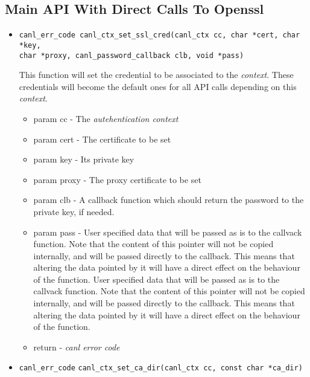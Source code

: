 \subsection{Main API With Direct Calls To Openssl}

\begin{itemize}
  \item \begin{verbatim}canl_err_code canl_ctx_set_ssl_cred(canl_ctx cc, char *cert, char *key,
char *proxy, canl_password_callback clb, void *pass)\end{verbatim}
  This function will set the credential to be associated to the
  \textit{context}.  These credentials will become the default ones 
  for all API calls depending on this \textit{context}.
  \begin{itemize}
    \item param cc - The \textit{autehentication context}
    \item param cert - The certificate to be set
    \item param key - Its private key
    \item param proxy - The proxy certificate to be set
    \item param clb - A callback function which should return 
    the password to the private key, if needed.
    \item param pass - User specified data that will be passed 
    as is to the callvack function.  Note that the content of this 
    pointer will not be copied internally, and will be passed
    directly to the callback.  This means that altering the 
    data pointed by it will have
    a direct effect on the behaviour of the function. User specified 
    data that will be passed as is to the callvack function.  Note that
    the content of this pointer will not be copied internally, and 
    will be passed
    directly to the callback.  This means that altering the data 
    pointed by it will have a direct effect on the behaviour of the function.
    \item return - \textit{canl error code}
  \end{itemize}
  \item \verb'canl_err_code'
  \verb'canl_ctx_set_ca_dir(canl_ctx cc, const char *ca_dir)'


\end{itemize}

